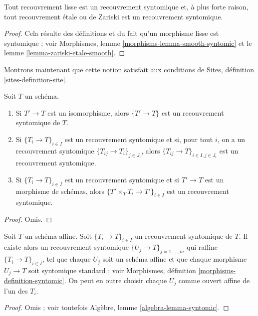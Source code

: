\begin{lemma}
\label{lemma-zariski-etale-smooth-syntomic}
Tout recouvrement lisse est un recouvrement syntomique et, à plus forte raison,
tout recouvrement étale ou de Zariski est un recouvrement syntomique.
\end{lemma}

\begin{proof}
Cela résulte des définitions et du fait qu'un
morphisme lisse est syntomique ; voir
Morphismes, lemme \ref{morphisms-lemma-smooth-syntomic}
et le lemme \ref{lemma-zariski-etale-smooth}.
\end{proof}

\noindent
Montrons maintenant que cette notion satisfait aux conditions de
Sites, définition \ref{sites-definition-site}.

\begin{lemma}
\label{lemma-syntomic}
Soit $T$ un schéma.
\begin{enumerate}
\item Si $T' \to T$ est un isomorphisme, alors $\{T' \to T\}$
est un recouvrement syntomique de $T$.
\item Si $\{T_i \to T\}_{i\in I}$ est un recouvrement syntomique et si, pour tout
$i$, on a un recouvrement syntomique $\{T_{ij} \to T_i\}_{j\in J_i}$, alors
$\{T_{ij} \to T\}_{i \in I, j\in J_i}$ est un recouvrement syntomique.
\item Si $\{T_i \to T\}_{i\in I}$ est un recouvrement syntomique
et si $T' \to T$ est un morphisme de schémas, alors
$\{T' \times_T T_i \to T'\}_{i\in I}$ est un recouvrement syntomique.
\end{enumerate}
\end{lemma}

\begin{proof}
Omis.
\end{proof}

\begin{lemma}
\label{lemma-syntomic-affine}
Soit $T$ un schéma affine.
Soit $\{T_i \to T\}_{i \in I}$ un recouvrement syntomique de $T$.
Il existe alors un recouvrement syntomique
$\{U_j \to T\}_{j = 1, \ldots, m}$ qui raffine
$\{T_i \to T\}_{i \in I}$, tel que chaque $U_j$ soit un schéma
affine et que chaque morphisme $U_j \to T$ soit syntomique
standard ; voir Morphismes, définition \ref{morphisms-definition-syntomic}.
On peut en outre choisir chaque $U_j$ comme ouvert affine de l'un des $T_i$.
\end{lemma}

\begin{proof}
Omis ; voir toutefois Algèbre, lemme \ref{algebra-lemma-syntomic}.
\end{proof}

